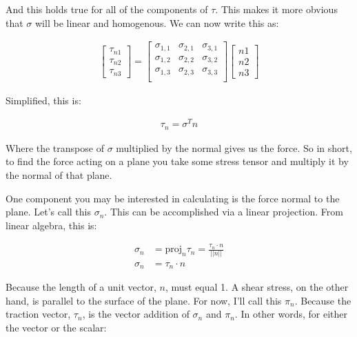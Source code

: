 \documentclass[12pt]{report}
\begin{document}
And this holds true for all of the components of $\tau$. This makes it more obvious that $\sigma$ will be linear and homogenous. We can now write this as: 

\begin{align}
\begin{bmatrix} %
\tau_{n1} \\
\tau_{n2} \\
\tau_{n3}
\end{bmatrix}
=
\begin{bmatrix} %
\sigma_{1,1} & \sigma_{2,1} & \sigma_{3,1} \\
\sigma_{1,2} & \sigma_{2,2} & \sigma_{3,2} \\
\sigma_{1,3} & \sigma_{2,3} & \sigma_{3,3} \\
\end{bmatrix}
\begin{bmatrix} %
n1 \\
n2 \\
n3
\end{bmatrix}
\end{align}

Simplified, this is: 

\begin{equation} \label{phenom1}
\begin{split}
\tau_n = \sigma^Tn
\end{split}
\end{equation}

Where the transpose of $\sigma$ multiplied by the normal gives us the force. So in short, to find the force acting on a plane you take some stress tensor and multiply it by the normal of that plane.\newline



One component you may be interested in calculating is the force normal to the plane. Let's call this $\sigma_n$. This can be accomplished via a linear projection. From linear algebra, this is: 


\begin{equation} \label{phenom1}
\begin{split}
\sigma_n &= \mathrm{proj}_n\tau_n = \frac{\tau_n \cdot n}{||n||}\\
\sigma_n &= \tau_n \cdot n
\end{split}
\end{equation}

Because the length of a unit vector, $n$, must equal 1. A shear stress, on the other hand, is parallel to the surface of the plane. For now, I'll call this $\pi_n$. Because the traction vector, $\tau_n$, is the vector addition of $\sigma_n$ and $\pi_n$. In other words, for either the vector or the scalar: 
\end{document}
